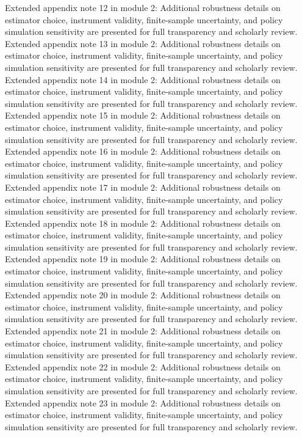 \documentclass[preprint,12pt]{elsarticle}
\begin{document}
Extended appendix note 12 in module 2: Additional robustness details on estimator choice, instrument validity, finite-sample uncertainty, and policy simulation sensitivity are presented for full transparency and scholarly review.
Extended appendix note 13 in module 2: Additional robustness details on estimator choice, instrument validity, finite-sample uncertainty, and policy simulation sensitivity are presented for full transparency and scholarly review.
Extended appendix note 14 in module 2: Additional robustness details on estimator choice, instrument validity, finite-sample uncertainty, and policy simulation sensitivity are presented for full transparency and scholarly review.
Extended appendix note 15 in module 2: Additional robustness details on estimator choice, instrument validity, finite-sample uncertainty, and policy simulation sensitivity are presented for full transparency and scholarly review.
Extended appendix note 16 in module 2: Additional robustness details on estimator choice, instrument validity, finite-sample uncertainty, and policy simulation sensitivity are presented for full transparency and scholarly review.
Extended appendix note 17 in module 2: Additional robustness details on estimator choice, instrument validity, finite-sample uncertainty, and policy simulation sensitivity are presented for full transparency and scholarly review.
Extended appendix note 18 in module 2: Additional robustness details on estimator choice, instrument validity, finite-sample uncertainty, and policy simulation sensitivity are presented for full transparency and scholarly review.
Extended appendix note 19 in module 2: Additional robustness details on estimator choice, instrument validity, finite-sample uncertainty, and policy simulation sensitivity are presented for full transparency and scholarly review.
Extended appendix note 20 in module 2: Additional robustness details on estimator choice, instrument validity, finite-sample uncertainty, and policy simulation sensitivity are presented for full transparency and scholarly review.
Extended appendix note 21 in module 2: Additional robustness details on estimator choice, instrument validity, finite-sample uncertainty, and policy simulation sensitivity are presented for full transparency and scholarly review.
Extended appendix note 22 in module 2: Additional robustness details on estimator choice, instrument validity, finite-sample uncertainty, and policy simulation sensitivity are presented for full transparency and scholarly review.
Extended appendix note 23 in module 2: Additional robustness details on estimator choice, instrument validity, finite-sample uncertainty, and policy simulation sensitivity are presented for full transparency and scholarly review.
\end{document}
